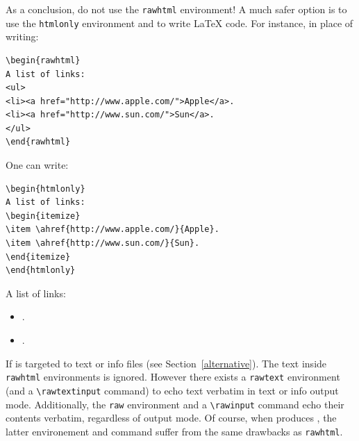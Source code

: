 As a conclusion, do not use the \texttt{rawhtml} environment!
A much safer option is to use the \texttt{htmlonly} environment
and to write \LaTeX{} code.
For instance, in place of writing:
\begin{verbatim}
\begin{rawhtml}
A list of links:
<ul>
<li><a href="http://www.apple.com/">Apple</a>.
<li><a href="http://www.sun.com/">Sun</a>.
</ul>
\end{rawhtml}
\end{verbatim}
One can write:
\begin{verbatim}
\begin{htmlonly}
A list of links:
\begin{itemize}
\item \ahref{http://www.apple.com/}{Apple}.
\item \ahref{http://www.sun.com/}{Sun}.
\end{itemize}
\end{htmlonly}
\end{verbatim}
\begin{htmlonly}
A list of links:
\begin{itemize}
\item {}.
\item {}.
\end{itemize}
\end{htmlonly}


If \hevea{} is targeted to text or info files (see
Section~\ref{alternative}).
The text inside \texttt{rawhtml} environments is ignored.
However there exists a \texttt{rawtext} environment (and a
\verb+\rawtextinput+ command) to echo text verbatim in text or info
output mode.
Additionally, the \texttt{raw} environment and a \verb+\rawinput+
command echo their contents verbatim, regardless of \hevea{} output
mode. Of course, when \hevea{} produces \html{},
the latter environement and command suffer from
the same drawbacks as \texttt{rawhtml}.

